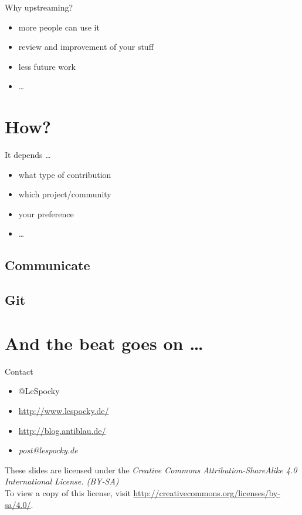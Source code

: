 \documentclass{beamer}
\begin{document}
\begin{frame}{Why upstreaming?}
    \begin{itemize}
        \item more people can use it
        \item review and improvement of your stuff
        \item less future work
        \item \dots
    \end{itemize}
\end{frame}

\section{How?}

\begin{frame}{It depends \dots}
    \begin{itemize}
        \item what type of contribution
        \item which project/community
        \item your preference
        \item \dots
    \end{itemize}
\end{frame}

\subsection{Communicate}

\subsection{Git}

\section*{And the beat goes on \dots}

\begin{frame}{Contact}
    \begin{itemize}
        \item @LeSpocky
        \item \url{http://www.lespocky.de/}
        \item \url{http://blog.antiblau.de/}
        \item \emph{post@lespocky.de}
    \end{itemize}

    \vspace{1em}
    \small
    These slides are licensed under the \emph{Creative Commons
    Attribution-ShareAlike 4.0 International License. (BY-SA)} \\
    To view a copy of this license, visit
    \url{http://creativecommons.org/licenses/by-sa/4.0/}.
    \normalsize
\end{frame}
\end{document}
